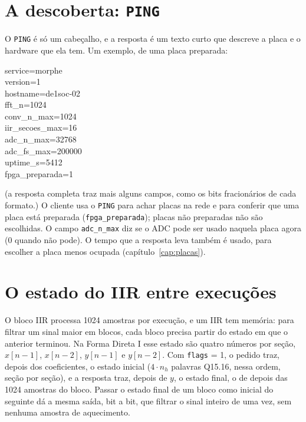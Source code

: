 \section{A descoberta: \texttt{PING}}
\label{sec:ping}

O \texttt{PING} é só um cabeçalho, e a resposta é um texto curto que descreve a
placa e o hardware que ela tem. Um exemplo, de uma placa preparada:

\begin{center}
\begin{minipage}{0.6\textwidth}
\small\ttfamily
service=morphe\\
version=1\\
hostname=de1soc-02\\
fft\_n=1024\\
conv\_n\_max=1024\\
iir\_secoes\_max=16\\
adc\_n\_max=32768\\
adc\_fs\_max=200000\\
uptime\_s=5412\\
fpga\_preparada=1
\end{minipage}
\end{center}

\noindent (a resposta completa traz mais alguns campos, como os bits
fracionários de cada formato.) O cliente usa o \texttt{PING} para achar placas
na rede e para conferir que uma placa está preparada
(\texttt{fpga\_preparada}); placas não preparadas não são escolhidas. O campo
\texttt{adc\_n\_max} diz se o ADC pode ser usado naquela placa agora (0 quando
não pode). O tempo que a resposta leva também é usado, para escolher a placa
menos ocupada (capítulo~\ref{cap:placas}).

\section{O estado do IIR entre execuções}
\label{sec:iir-estado}

O bloco IIR processa 1024 amostras por execução, e um IIR tem memória: para
filtrar um sinal maior em blocos, cada bloco precisa partir do estado em que o
anterior terminou. Na Forma Direta I esse estado são quatro números por seção,
\(x[n-1]\), \(x[n-2]\), \(y[n-1]\) e \(y[n-2]\). Com \texttt{flags} = 1, o
pedido traz, depois dos coeficientes, o estado inicial (\(4 \cdot n_h\) palavras
Q15.16, nessa ordem, seção por seção), e a resposta traz, depois de \(y\), o
estado final, o de depois das 1024 amostras do bloco. Passar o estado final de
um bloco como inicial do seguinte dá a mesma saída, bit a bit, que filtrar o
sinal inteiro de uma vez, sem nenhuma amostra de aquecimento.

